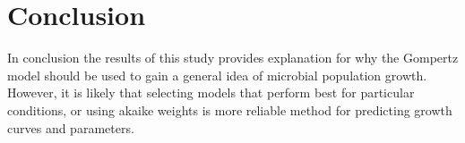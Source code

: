 \documentclass[11pt]{article}
\begin{document}
\section{Conclusion}
In conclusion the results of this study provides explanation for why the Gompertz model should be used to gain a general idea of microbial population growth. However, it is likely that selecting models that perform best for particular conditions, or using akaike weights is more reliable method for predicting growth curves and parameters.



 
  
  
  
\end{document}
